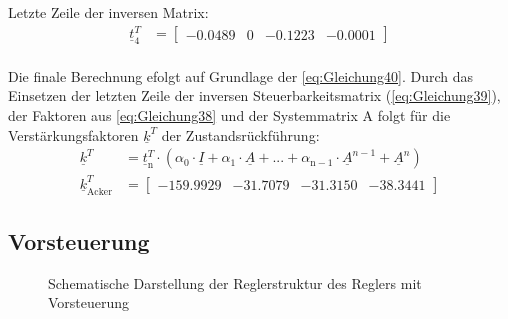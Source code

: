 \documentclass[
	pagesize,
	fontsize=12pt,
	paper=a4,
	oneside,
   reqno
]{scrartcl}
\begin{document}
Letzte Zeile der inversen Matrix:
\begin{align} \label{eq:Gleichung39}
    \underline{t}_{\mathrm{4}}^T &=
    \begin{bmatrix}
        -0.0489 & 0 & -0.1223 & -0.0001
    \end{bmatrix}
\end{align}\\
Die finale Berechnung efolgt auf Grundlage der \autoref{eq:Gleichung40}. Durch das Einsetzen der letzten Zeile der inversen Steuerbarkeitsmatrix (\autoref{eq:Gleichung39}), der Faktoren aus \autoref{eq:Gleichung38} und der Systemmatrix A folgt für die Verstärkungsfaktoren $\underline{k}^T$ der Zustandsrückführung:
\begin{align}
    \underline{k}^T &= \underline{t}_{\mathrm{n}}^T\cdot(\alpha_{\mathrm{0}}\cdot\underline{I} + \alpha_{\mathrm{1}}\cdot \underline{A} + ... + \alpha_{\mathrm{n-1}}\cdot \underline{A}^{n-1}+\underline{A}^n) \label{eq:Gleichung40}\\
    \underline{k}^T_{\mathrm{Acker}} &=
    \begin{bmatrix}
        -159.9929 & -31.7079 & -31.3150 & -38.3441
    \end{bmatrix} \label{eq:Gleichung41}
\end{align}

\subsection{Vorsteuerung}

\begin{figure}[H]
    \centering
    \caption[Reglerstruktur Vorsteuerung]{Schematische Darstellung der Reglerstruktur des Reglers mit Vorsteuerung}
    \label{fig:Bild8.5}
\end{figure}
\end{document}

